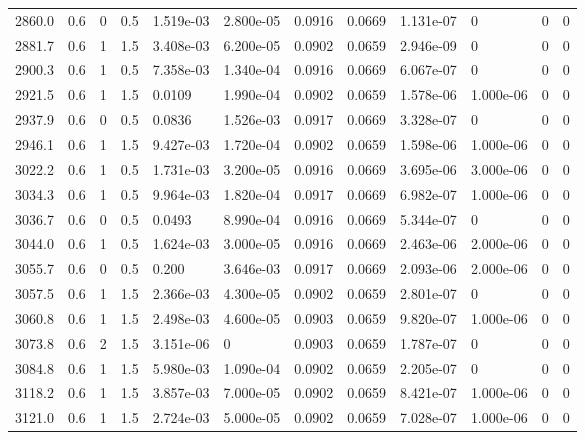 \documentclass[preview]{standalone}
\begin{document}
{{{\begin{tabular}{L{1.2cm}C{1.2cm} C{0.3cm}C{0.5cm} C{1.4cm}C{1.4cm} C{1.4cm}C{1.4cm} C{1.6cm}C{1.6cm} C{1.6cm}C{1.6cm}}
  2860.0  &   0.6  & 0     & 0.5 &  1.519e-03  & 2.800e-05  &  0.0916&   0.0669& 1.131e-07 & 0   &  0 & 0  \\ 
  2881.7  &   0.6  & 1     & 1.5 &  3.408e-03  & 6.200e-05  &  0.0902&   0.0659& 2.946e-09 & 0   &  0 & 0  \\ 
  2900.3  &   0.6  & 1     & 0.5 &  7.358e-03  & 1.340e-04  &  0.0916&   0.0669& 6.067e-07 & 0   &  0 & 0  \\ 
  2921.5  &   0.6  & 1     & 1.5 &  0.0109  & 1.990e-04  &  0.0902&   0.0659& 1.578e-06 & 1.000e-06   &  0 & 0  \\ 
  2937.9  &   0.6  & 0     & 0.5 &  0.0836  & 1.526e-03  &  0.0917&   0.0669& 3.328e-07 & 0   &  0 & 0  \\ 
  2946.1  &   0.6  & 1     & 1.5 &  9.427e-03  & 1.720e-04  &  0.0902&   0.0659& 1.598e-06 & 1.000e-06   &  0 & 0  \\ 
  3022.2  &   0.6  & 1     & 0.5 &  1.731e-03  & 3.200e-05  &  0.0916&   0.0669& 3.695e-06 & 3.000e-06   &  0 & 0  \\ 
  3034.3  &   0.6  & 1     & 0.5 &  9.964e-03  & 1.820e-04  &  0.0917&   0.0669& 6.982e-07 & 1.000e-06   &  0 & 0  \\ 
  3036.7  &   0.6  & 0     & 0.5 &  0.0493  & 8.990e-04  &  0.0916&   0.0669& 5.344e-07 & 0   &  0 & 0  \\ 
  3044.0  &   0.6  & 1     & 0.5 &  1.624e-03  & 3.000e-05  &  0.0916&   0.0669& 2.463e-06 & 2.000e-06   &  0 & 0  \\ 
  3055.7  &   0.6  & 0     & 0.5 &  0.200  & 3.646e-03  &  0.0917&   0.0669& 2.093e-06 & 2.000e-06   &  0 & 0  \\ 
  3057.5  &   0.6  & 1     & 1.5 &  2.366e-03  & 4.300e-05  &  0.0902&   0.0659& 2.801e-07 & 0   &  0 & 0  \\ 
  3060.8  &   0.6  & 1     & 1.5 &  2.498e-03  & 4.600e-05  &  0.0903&   0.0659& 9.820e-07 & 1.000e-06   &  0 & 0  \\ 
  3073.8  &   0.6  & 2     & 1.5 &  3.151e-06  & 0  &  0.0903&   0.0659& 1.787e-07 & 0   &  0 & 0  \\ 
  3084.8  &   0.6  & 1     & 1.5 &  5.980e-03  & 1.090e-04  &  0.0902&   0.0659& 2.205e-07 & 0   &  0 & 0  \\ 
  3118.2  &   0.6  & 1     & 1.5 &  3.857e-03  & 7.000e-05  &  0.0902&   0.0659& 8.421e-07 & 1.000e-06   &  0 & 0  \\ 
  3121.0  &   0.6  & 1     & 1.5 &  2.724e-03  & 5.000e-05  &  0.0902&   0.0659& 7.028e-07 & 1.000e-06   &  0 & 0  \\ 

\end{tabular}}}}
\end{document}
